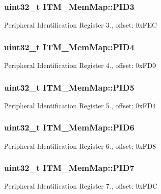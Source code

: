 \subsubsection[{P\+I\+D3}]{\setlength{\rightskip}{0pt plus 5cm}uint32\+\_\+t I\+T\+M\+\_\+\+Mem\+Map\+::\+P\+I\+D3}\label{struct_i_t_m___mem_map_a224feb863e1cd18dcb71e8da810f9d61}
Peripheral Identification Register 3., offset\+: 0x\+F\+E\+C \hypertarget{struct_i_t_m___mem_map_ab25032ed174621fec16ce7f0b797e251}{}
\subsubsection[{P\+I\+D4}]{\setlength{\rightskip}{0pt plus 5cm}uint32\+\_\+t I\+T\+M\+\_\+\+Mem\+Map\+::\+P\+I\+D4}\label{struct_i_t_m___mem_map_ab25032ed174621fec16ce7f0b797e251}
Peripheral Identification Register 4., offset\+: 0x\+F\+D0 \hypertarget{struct_i_t_m___mem_map_a44b9d410c8989eb78aa4ea68a32e4bc5}{}
\subsubsection[{P\+I\+D5}]{\setlength{\rightskip}{0pt plus 5cm}uint32\+\_\+t I\+T\+M\+\_\+\+Mem\+Map\+::\+P\+I\+D5}\label{struct_i_t_m___mem_map_a44b9d410c8989eb78aa4ea68a32e4bc5}
Peripheral Identification Register 5., offset\+: 0x\+F\+D4 \hypertarget{struct_i_t_m___mem_map_ab3ff032be95ac6f7ed1148ad6df2898b}{}
\subsubsection[{P\+I\+D6}]{\setlength{\rightskip}{0pt plus 5cm}uint32\+\_\+t I\+T\+M\+\_\+\+Mem\+Map\+::\+P\+I\+D6}\label{struct_i_t_m___mem_map_ab3ff032be95ac6f7ed1148ad6df2898b}
Peripheral Identification Register 6., offset\+: 0x\+F\+D8 \hypertarget{struct_i_t_m___mem_map_ab5d680cdaa89677231777f60835b9b1b}{}
\subsubsection[{P\+I\+D7}]{\setlength{\rightskip}{0pt plus 5cm}uint32\+\_\+t I\+T\+M\+\_\+\+Mem\+Map\+::\+P\+I\+D7}\label{struct_i_t_m___mem_map_ab5d680cdaa89677231777f60835b9b1b}
Peripheral Identification Register 7., offset\+: 0x\+F\+D\+C \hypertarget{struct_i_t_m___mem_map_afb3f200b95047ddd2dc4b045887ebfa3}{}
